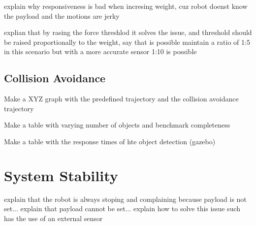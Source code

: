 \par explain why responsiveness is bad when incresing weight, cuz robot doenst know the payload and the motions are jerky

\par explian that by rasing the force threshlod it solves the issue, and threshold should be raised proportionally to the weight, say that is possible maintain a ratio of 1:5 in this scenario but with a more accurate sensor 1:10 is possible

\subsection{Collision Avoidance}

\par Make a XYZ graph with the predefined trajectory and the collision avoidance trajectory
\par Make a table with varying number of objects and benchmark completeness
\par Make a table with the response times of hte object detection (gazebo)

\section{System Stability}

\par explain that the robot is always stoping and complaining because payload is not set... explain that payload cannot be set... explain how to solve this issue such has the use of an external sensor